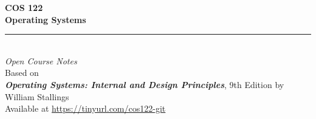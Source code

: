 \begin{titlepage}

    \vspace*{4cm}

    \begin{center}
        {\Huge \bfseries COS 122}\\[0.5cm]
        {\Huge \bfseries Operating Systems}\\[1.5cm]
        
        \rule{\textwidth}{0.4pt}\\[1.5cm]

    
        {\normalsize \textit{Open Course Notes}}\\[1.5cm]
        {\normalsize Based on \\ \textit{\textbf{Operating Systems: Internal and Design Principles}}, 9th Edition by William Stallings}\\[3cm]
        

        {\footnotesize Available at \url{https://tinyurl.com/cos122-git}}
    \end{center}
\end{titlepage}

